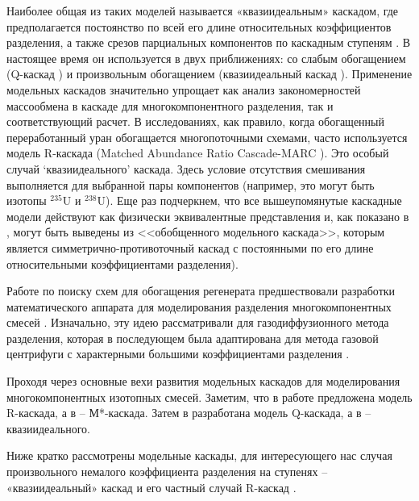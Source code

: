 Наиболее общая из таких моделей называется «квазиидеальным» каскадом, где предполагается постоянство по всей его длине относительных коэффициентов разделения, а также срезов парциальных компонентов по каскадным ступеням \cite{yamamotoMulticomponentIsotopeSeparating1978}.
В настоящее время он используется в двух приближениях: со слабым обогащением (Q-каскад \cite{borisevichNewApproachOptimize2011, kolokoltsovDesignCascadesSeparating1970, zengQCascadeExplanation2012}) и произвольным обогащением (квазиидеальный каскад \cite{sulaberidzeSpecialFeaturesEnrichment2006}).
Применение модельных каскадов значительно упрощает как анализ закономерностей массообмена в каскаде для многокомпонентного разделения, так и соответствующий расчет.
В исследованиях, как правило, когда обогащенный переработанный уран обогащается многопоточными схемами, часто используется модель R-каскада (Matched Abundance Ratio Cascade-MARC \cite{kazukihidaSimultaneousEvaluationEffects1986, delagarzaMulticomponentIsotopeSeparation1961, woodEffectsSeparationProcesses2008}).
Это особый случай `квазиидеального' каскада. Здесь условие отсутствия смешивания выполняется для выбранной пары компонентов (например, это могут быть изотопы $^{235}$U и $^{238}$U).
Еще раз подчеркнем, что все вышеупомянутые каскадные модели действуют как физически эквивалентные представления и, как показано в \cite{sulaberidzeClassificationModelCascades2020}, могут быть выведены из <<обобщенного модельного каскада>>, которым является симметрично-противоточный каскад с постоянными по его длине относительными коэффициентами разделения).

Работе по поиску схем для обогащения регенерата предшествовали разработки математического аппарата для моделирования разделения многокомпонентных смесей \cite{delagarzaMulticomponentIsotopeSeparation1961}.
Изначально, эту идею рассматривали для газодиффузионного метода разделения, которая в последующем была адаптирована для метода газовой центрифуги с характерными большими коэффициентами разделения \cite{yamamotoMulticomponentIsotopeSeparating1978}.

Проходя через основные вехи развития модельных каскадов для моделирования многокомпонентных изотопных смесей. Заметим, что в работе \cite{delagarzaMulticomponentIsotopeSeparation1961} предложена модель R-каскада, а в \cite{levin1963} -- М*-каскада.
Затем в \cite{kolokoltsovDesignCascadesSeparating1970} разработана модель Q-каскада, а в \cite{sazykinKvaziidealnyeKaskadyDlya2000} -- квазиидеального.

Ниже кратко рассмотрены модельные каскады, для интересующего нас случая произвольного немалого коэффициента разделения на ступенях -- «квазиидеальный» каскад и его частный случай R-каскад \cite{sazykinKvaziidealnyeKaskadyDlya2000}.

